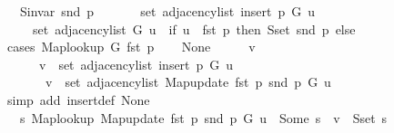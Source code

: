 \begin{isabellebody}
\ \ \ {\isachardoublequoteopen}S{\isachardot}{\kern0pt}invar\ {\isacharparenleft}{\kern0pt}snd\ p{\isacharparenright}{\kern0pt}{\isachardoublequoteclose}\isanewline
\ \ \isanewline
\ \ \ \ {\isachardoublequoteopen}set\ {\isacharparenleft}{\kern0pt}adjacency{\isacharunderscore}{\kern0pt}list\ {\isacharparenleft}{\kern0pt}insert{\isacharunderscore}{\kern0pt}{}\ p\ G{\isacharparenright}{\kern0pt}\ u{\isacharparenright}{\kern0pt}\ {\isacharequal}{\kern0pt}\isanewline
\ \ \ \ \ set\ {\isacharparenleft}{\kern0pt}adjacency{\isacharunderscore}{\kern0pt}list\ G\ u{\isacharparenright}{\kern0pt}\ {\isasymunion}\ {\isacharparenleft}{\kern0pt}if\ u\ {\isacharequal}{\kern0pt}\ fst\ p\ then\ S{\isachardot}{\kern0pt}set\ {\isacharparenleft}{\kern0pt}snd\ p{\isacharparenright}{\kern0pt}\ else\ {\isacharbraceleft}{\kern0pt}{\isacharbraceright}{\kern0pt}{\isacharparenright}{\kern0pt}{\isachardoublequoteclose}\isanewline
%
\isadelimproof
%
\endisadelimproof
%
\isatagproof
{}\isamarkupfalse%
\ {\isacharparenleft}{\kern0pt}cases\ {\isachardoublequoteopen}Map{\isacharunderscore}{\kern0pt}lookup\ G\ {\isacharparenleft}{\kern0pt}fst\ p{\isacharparenright}{\kern0pt}{\isachardoublequoteclose}{\isacharparenright}{\kern0pt}\isanewline
\ \ \isamarkupfalse%
\ None\isanewline
\ \ \isacommand{{\isacharbraceleft}{\kern0pt}}\isamarkupfalse%
\ \isamarkupfalse%
\ v\isanewline
\ \ \ \ \isamarkupfalse%
\isanewline
\ \ \ \ \ \ {\isachardoublequoteopen}v\ {\isasymin}\ set\ {\isacharparenleft}{\kern0pt}adjacency{\isacharunderscore}{\kern0pt}list\ {\isacharparenleft}{\kern0pt}insert{\isacharunderscore}{\kern0pt}{}\ p\ G{\isacharparenright}{\kern0pt}\ u{\isacharparenright}{\kern0pt}\ {\isasymlongleftrightarrow}\isanewline
\ \ \ \ \ \ \ v\ {\isasymin}\ set\ {\isacharparenleft}{\kern0pt}adjacency{\isacharunderscore}{\kern0pt}list\ {\isacharparenleft}{\kern0pt}Map{\isacharunderscore}{\kern0pt}update\ {\isacharparenleft}{\kern0pt}fst\ p{\isacharparenright}{\kern0pt}\ {\isacharparenleft}{\kern0pt}snd\ p{\isacharparenright}{\kern0pt}\ G{\isacharparenright}{\kern0pt}\ u{\isacharparenright}{\kern0pt}{\isachardoublequoteclose}\isanewline
\ \ \ \ \ \ \isamarkupfalse%
\ {\isacharparenleft}{\kern0pt}simp\ add{\isacharcolon}{\kern0pt}\ insert{\isacharunderscore}{\kern0pt}{}{\isacharunderscore}{\kern0pt}def\ None{\isacharparenright}{\kern0pt}\isanewline
\ \ \ \ \isamarkupfalse%
\ \isamarkupfalse%
\ {\isachardoublequoteopen}{\isachardot}{\kern0pt}{\isachardot}{\kern0pt}{\isachardot}{\kern0pt}\ {\isasymlongleftrightarrow}\ {\isacharparenleft}{\kern0pt}{\isasymexists}s{\isachardot}{\kern0pt}\ Map{\isacharunderscore}{\kern0pt}lookup\ {\isacharparenleft}{\kern0pt}Map{\isacharunderscore}{\kern0pt}update\ {\isacharparenleft}{\kern0pt}fst\ p{\isacharparenright}{\kern0pt}\ {\isacharparenleft}{\kern0pt}snd\ p{\isacharparenright}{\kern0pt}\ G{\isacharparenright}{\kern0pt}\ u\ {\isacharequal}{\kern0pt}\ Some\ s\ {\isasymand}\ v\ {\isasymin}\ S{\isachardot}{\kern0pt}set\ s{\isacharparenright}{\kern0pt}{\isachardoublequoteclose}\isanewline

\end{isabellebody}

